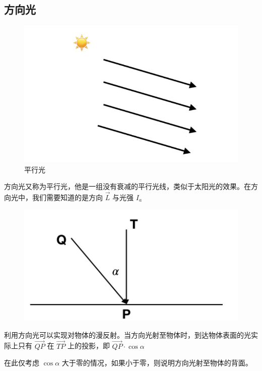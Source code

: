 \documentclass[12pt,oneside,a4paper]{ctexart}
\begin{document}
\subsection{方向光}
\begin{figure}[H]
	\centering
	\includegraphics[scale=0.3]{Picture/latex5.1.png}
	\vspace{-2ex}
	\caption{平行光}
\end{figure}

方向光又称为平行光，他是一组没有衰减的平行光线，类似于太阳光的效果。在方向光中，我们需要知道的是方向 $\vec{L}$ 与光强 $I_{a}$
\begin{figure}[H]
	\centering
	\includegraphics[scale=0.3]{Picture/latex5.2.png}
	\vspace{-2ex}
\end{figure}

利用方向光可以实现对物体的漫反射。当方向光射至物体时，到达物体表面的光实际上只有 $\vec{QP}$ 在 $\vec{TP}$ 上的投影，即 $\vec{QP} \cdot \cos{\alpha}$

在此仅考虑 $\cos{\alpha}$ 大于零的情况，如果小于零，则说明方向光射至物体的背面。
\end{document}
